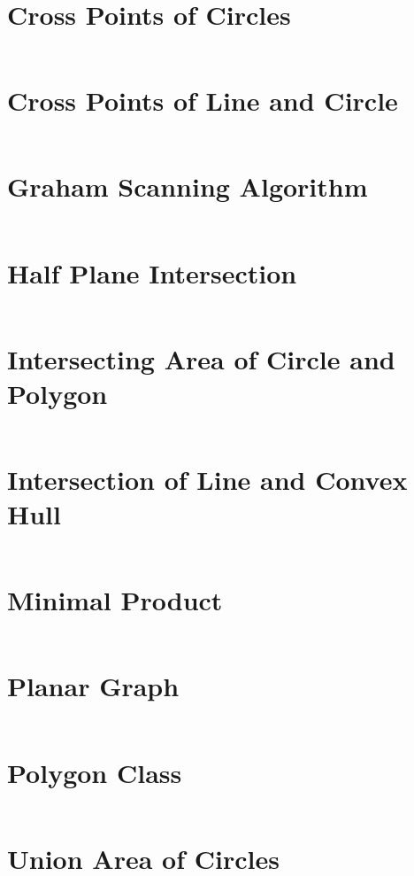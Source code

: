 \documentclass[a4paper,openany]{book}
\newcommand{\cppcode}[1]
{
  \inputminted[mathescape,
  tabsize=4,
  linenos,
  framesep=2mm,
  breakaftergroup=true,
  breakautoindent=true,
  breakbytoken=true,
  breaklines=true,
  fontsize=\small
  ]{cpp}{source/#1}
}
\begin{document}
\section{Cross Points of Circles}
\cppcode{Computational Geometry/Cross Points of Circles.cpp}
\section{Cross Points of Line and Circle}
\cppcode{Computational Geometry/Cross Points of Line and Circle.cpp}
\section{Graham Scanning Algorithm}
\cppcode{Computational Geometry/Graham Scanning Algorithm.cpp}
\section{Half Plane Intersection}
\cppcode{Computational Geometry/Half Plane Intersection.cpp}
\section{Intersecting Area of Circle and Polygon}
\cppcode{Computational Geometry/Intersecting Area of Circle and Polygon.cpp}
\section{Intersection of Line and Convex Hull}
\cppcode{Computational Geometry/Intersection of Line and Convex Hull.cpp}
\section{Minimal Product}
\cppcode{Computational Geometry/Minimal Product.cpp}
\section{Planar Graph}
\cppcode{Computational Geometry/Planar Graph.cpp}
\section{Polygon Class}
\cppcode{Computational Geometry/Polygon Class.cpp}
\section{Union Area of Circles}
\cppcode{Computational Geometry/Union Area of Circles.cpp}
\end{document}
